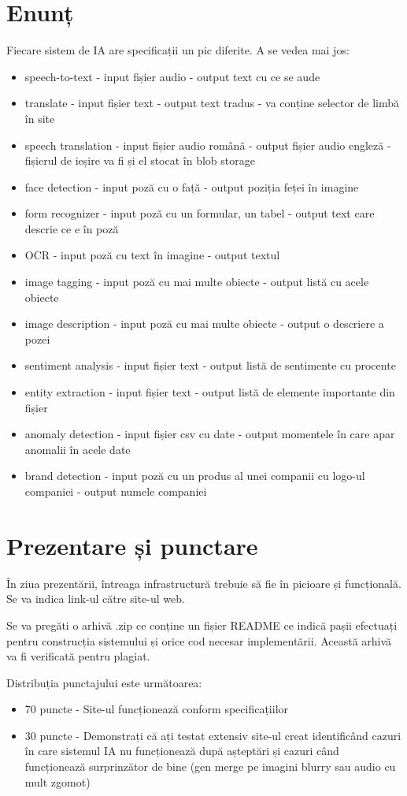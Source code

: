 \documentclass{article}
\newcounter{ProblemCounter} %
\newcommand{\ProblemName}{}
\newenvironment{Problem}[1][Sectiunea \arabic{ProblemCounter}]{ %
\stepcounter{ProblemCounter} %
\renewcommand{\ProblemName}{#1} %
\section{\ProblemName} %
}{}
\begin{document}
\begin{Problem}[Enunț]
Fiecare sistem de IA are specificații un pic diferite. A se vedea mai jos:
\begin{itemize}
    \item speech-to-text - input fișier audio - output text cu ce se aude
    \item translate - input fișier text - output text tradus - va conține selector de limbă în site
    \item speech translation - input fișier audio română - output fișier audio engleză - fișierul de ieșire va fi și el stocat în blob storage
    \item face detection - input poză cu o față - output poziția feței în imagine
    \item form recognizer - input poză cu un formular, un tabel - output text care descrie ce e în poză
    \item OCR - input poză cu text în imagine - output textul
    \item image tagging - input poză cu mai multe obiecte - output listă cu acele obiecte
    \item image description - input poză cu mai multe obiecte - output o descriere a pozei
    \item sentiment analysis - input fișier text - output listă de sentimente cu procente
    \item entity extraction - input fișier text - output listă de elemente importante din fișier
    \item anomaly detection - input fișier csv cu date - output momentele în care apar anomalii în acele date
    \item brand detection - input poză cu un produs al unei companii cu logo-ul companiei - output numele companiei
\end{itemize}

\end{Problem}

\begin{Problem}[Prezentare și punctare]

În ziua prezentării, întreaga infrastructură trebuie să fie în picioare și funcțională. Se va indica link-ul către site-ul web.

Se va pregăti o arhivă .zip ce conține un fișier README ce indică pașii efectuați pentru construcția sistemului și orice cod necesar implementării. Această arhivă va fi verificată pentru plagiat.

    Distribuția punctajului este următoarea:
\begin{itemize}
    \item 70 puncte - Site-ul funcționează conform specificațiilor
    \item 30 puncte - Demonstrați că ați testat extensiv site-ul creat identificând cazuri în care sistemul IA nu funcționează după așteptări și cazuri când funcționează surprinzător de bine (gen merge pe imagini blurry sau audio cu mult zgomot)

\end{itemize}

\end{Problem}
\end{document}

